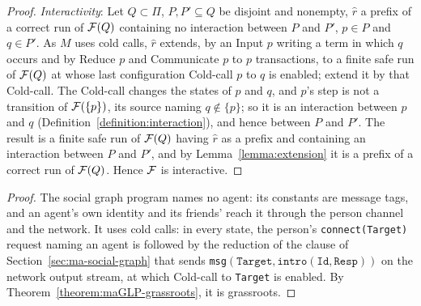 \begin{proof}
\emph{Interactivity}: Let $Q \subset \Pi$, $P, P' \subseteq Q$ be disjoint and nonempty, $\hat r$ a prefix of a correct run of $\mathcal{F}(Q)$ containing no interaction between $P$ and $P'$, $p \in P$ and $q \in P'$. As $M$ uses cold calls, $\hat r$ extends, by an Input $p$ writing a term in which $q$ occurs and by Reduce $p$ and Communicate $p$ to $p$ transactions, to a finite safe run of $\mathcal{F}(Q)$ at whose last configuration Cold-call $p$ to $q$ is enabled; extend it by that Cold-call. The Cold-call changes the states of $p$ and $q$, and $p$'s step is not a transition of $\mathcal{F}(\{p\})$, its source naming $q \notin \{p\}$; so it is an interaction between $p$ and $q$ (Definition~\ref{definition:interaction}), and hence between $P$ and $P'$. The result is a finite safe run of $\mathcal{F}(Q)$ having $\hat r$ as a prefix and containing an interaction between $P$ and $P'$, and by Lemma~\ref{lemma:extension} it is a prefix of a correct run of $\mathcal{F}(Q)$. Hence $\mathcal{F}$ is interactive.
\end{proof}

\corSocialGraphGrassroots*

\begin{proof}
The social graph program names no agent: its constants are message tags, and an agent's own identity and its friends' reach it through the person channel and the network. It uses cold calls: in every state, the person's \verb|connect(Target)| request naming an agent is followed by the reduction of the clause of Section~\ref{sec:ma-social-graph} that sends \verb|msg|$(\mathtt{Target}, \mathtt{intro}(\mathtt{Id}, \mathtt{Resp}))$ on the network output stream, at which Cold-call to \verb|Target| is enabled. By Theorem~\ref{theorem:maGLP-grassroots}, it is grassroots.
\end{proof}
